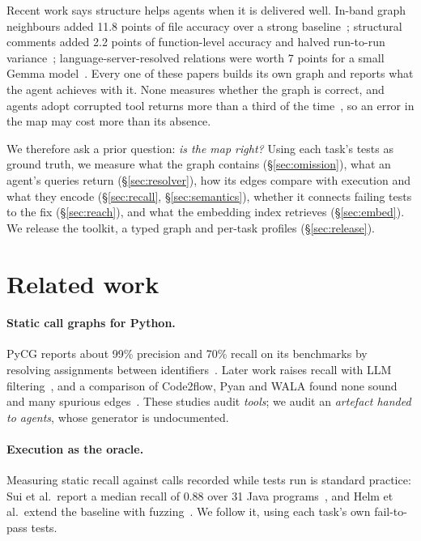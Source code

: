 \documentclass[10pt,a4paper]{article}
\begin{document}
Recent work says structure helps agents when it is delivered well. In-band graph neighbours added 11.8 points of file accuracy over a strong baseline~\cite{larger}; structural comments added 2.2 points of function-level accuracy and halved run-to-run variance~\cite{codeanchor}; language-server-resolved relations were worth 7 points for a small Gemma model~\cite{semnav}. Every one of these papers builds its own graph and reports what the agent achieves with it. None measures whether the graph is correct, and agents adopt corrupted tool returns more than a third of the time~\cite{overreliance}, so an error in the map may cost more than its absence.

We therefore ask a prior question: \emph{is the map right?} Using each task's tests as ground truth, we measure what the graph contains (\S\ref{sec:omission}), what an agent's queries return (\S\ref{sec:resolver}), how its edges compare with execution and what they encode (\S\ref{sec:recall}, \S\ref{sec:semantics}), whether it connects failing tests to the fix (\S\ref{sec:reach}), and what the embedding index retrieves (\S\ref{sec:embed}). We release the toolkit, a typed graph and per-task profiles (\S\ref{sec:release}).

\section{Related work}

\paragraph{Static call graphs for Python.} PyCG reports about 99\% precision and 70\% recall on its benchmarks by resolving assignments between identifiers~\cite{pycg}. Later work raises recall with LLM filtering~\cite{infercg}, and a comparison of Code2flow, Pyan and WALA found none sound and many spurious edges~\cite{kummita}. These studies audit \emph{tools}; we audit an \emph{artefact handed to agents}, whose generator is undocumented.

\paragraph{Execution as the oracle.} Measuring static recall against calls recorded while tests run is standard practice: Sui et al.\ report a median recall of 0.88 over 31 Java programs~\cite{sui}, and Helm et al.\ extend the baseline with fuzzing~\cite{helm}. We follow it, using each task's own fail-to-pass tests.
\end{document}
